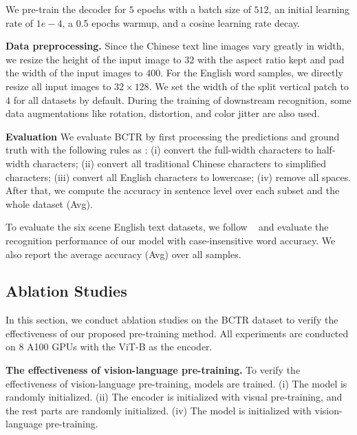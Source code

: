 We pre-train the decoder for $5$ epochs with a batch size of $512$, an initial learning rate of $1e-4$, a 0.5 epochs warmup, and a cosine learning rate decay. 

\vspace{2mm}
\noindent\textbf{Data preprocessing.}
Since the Chinese text line images vary greatly in width, we resize the height of the input image to $32$ with the aspect ratio kept and pad the width of the input images to $400$. For the English word samples, we directly resize all input images to $32\times128$.  We set the width of the split vertical patch to $4$ for all datasets by default. During the training of downstream recognition, some data augmentations like rotation, distortion, and color jitter are also used.

\vspace{2mm}
\noindent\textbf{Evaluation} We evaluate BCTR by first processing the predictions and ground truth with the following rules as \cite{chenBCTR}: (i) convert the full-width characters to half-width characters; (ii) convert all traditional Chinese characters to simplified characters; (iii) convert all English characters to lowercase; (iv) remove all spaces. After that, we compute the accuracy in sentence level over each subset and the whole dataset (Avg).


To evaluate the six scene English text datasets, we follow ~\cite{shi2018aster,yu2020towards,ShanchengFang2021ReadLH,YuxinWang2021FromTT,XinyunZhang2022ContextbasedCL} and evaluate the recognition performance of our model with case-insensitive word accuracy. We also report the average accuracy (Avg) over all samples.



\subsection{Ablation Studies}
In this section, we conduct ablation studies on the BCTR dataset to verify the effectiveness of our proposed pre-training method. All experiments are conducted on 8 A100 GPUs with the ViT-B as the encoder.

\vspace{2mm}
\noindent\textbf{The effectiveness of vision-language pre-training.}
To verify the effectiveness of vision-language pre-training,  models are trained. (i) The model is randomly initialized. (ii) The encoder is initialized with visual pre-training, and the rest parts are randomly initialized.  (iv) The model is initialized with vision-language pre-training.


